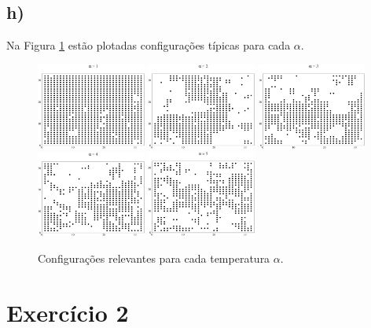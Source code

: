 \documentclass[a4wide]{report}
\begin{document}
\subsection*{h) }
Na Figura  \ref{1h} estão plotadas configurações típicas para cada $\alpha$.
\begin{figure}[!htb]
\centering
\includegraphics[width=0.32\textwidth]{1.pdf}
\includegraphics[width=0.32\textwidth]{2.pdf}
\includegraphics[width=0.32\textwidth]{3.pdf}
\includegraphics[width=0.32\textwidth]{4.pdf}
\includegraphics[width=0.32\textwidth]{5.pdf}
\caption{Configurações relevantes para cada temperatura $\alpha$.}
\label{1h}
\end{figure}

\section*{Exercício 2}
\end{document}
